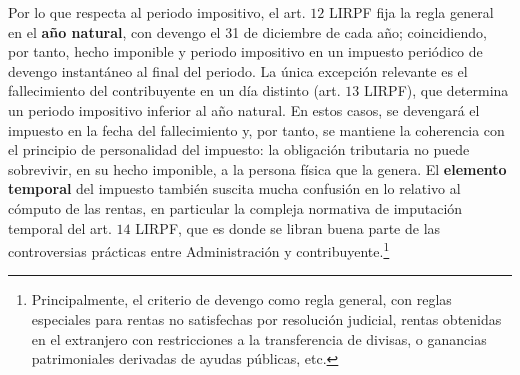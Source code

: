 \documentclass[10pt,a4paper]{article}
\begin{document}
Por lo que respecta al periodo impositivo, el art. $12$ LIRPF fija la regla general en el \textbf{año natural}, con devengo el 31 de diciembre de cada año; coincidiendo, por tanto, hecho imponible y periodo impositivo en un impuesto periódico de devengo instantáneo al final del periodo. La única excepción relevante es el fallecimiento del contribuyente en un día distinto (art. $13$ LIRPF), que determina un periodo impositivo inferior al año natural. En estos casos, se devengará el impuesto en la fecha del fallecimiento y, por tanto, se mantiene la coherencia con el principio de personalidad del impuesto: la obligación tributaria no puede sobrevivir, en su hecho imponible, a la persona física que la genera. El \textbf{elemento temporal} del impuesto también suscita mucha confusión en lo relativo al cómputo de las rentas, en particular la compleja normativa de imputación temporal del art. $14$ LIRPF, que es donde se libran buena parte de las controversias prácticas entre Administración y contribuyente.\footnote{%
    Principalmente, el criterio de devengo como regla general, con reglas especiales para rentas no satisfechas por resolución judicial, rentas obtenidas en el extranjero con restricciones a la transferencia de divisas, o ganancias patrimoniales derivadas de ayudas públicas, etc.
}
\end{document}
